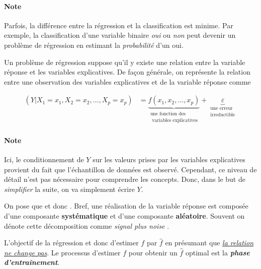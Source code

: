 \documentclass[french]{article}
\begin{document}
\begin{multicols*}{2}
\paragraph{Note}	Parfois, la différence entre la régression et la classification est minime. Par exemple, la classification d'une variable binaire \textit{oui} ou \textit{non} peut devenir un problème de régression en estimant la \textit{probabilité} d'un oui.

\bigskip

Un problème de régression suppose qu'il y existe une relation entre la variable réponse et les variables explicatives. De façon générale, on représente la relation entre une observation des variables explicatives et de la variable réponse comme 

\begin{align*}
	(Y | X_{1} = x_{1}, X_{2} = x_{2}, \dots, X_{p} = x_{p}) 
	&=	\underbrace{f(x_{1}, x_{2}, \dots, x_{p})}_{\substack{\text{une fonction des}\\ \text{ variables explicatives}}} + \underbrace{\varepsilon}_{\substack{\text{une erreur}\\ \text{irreductible}}}
\end{align*}

\paragraph{Note}	Ici, le conditionnement de $Y$ sur les valeurs prises par les variables explicatives provient du fait que l'échantillon de données est observé. Cependant, ce niveau de détail n'est pas nécessaire pour comprendre les concepts. Donc, dans le but de \textit{simplifier} la suite, on va simplement écrire $Y$.

\bigskip

On pose que  et donc . Bref, une réalisation de la variable réponse est composée d'une composante \textbf{systématique} et d'une composante \textbf{aléatoire}. Souvent on dénote cette décomposition comme \og \textit{signal plus noise} \fg{}.

\bigskip

L'objectif de la régression et donc d'estimer $f$ par $\hat{f}$ en présumant que \underline{\textit{la relation ne change pas}}. Le processus d'estimer $f$ pour obtenir un $\hat{f}$ optimal est la \textbf{\textit{phase d'entraînement}}.



\end{multicols*}
\end{document}
